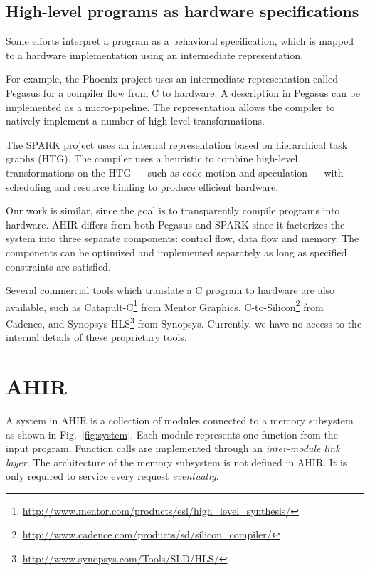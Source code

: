 \documentclass[conference]{IEEEtran}
\begin{document}
\subsection{High-level programs as hardware specifications}

Some efforts interpret a program as a behavioral
specification, which is mapped to a hardware implementation using an
intermediate representation.

For example, the Phoenix project uses an intermediate representation
called Pegasus\cite{pegasus-ir} for a compiler flow from C to
hardware\cite{pegasus-cash}. A description in Pegasus can be
implemented as a micro-pipeline. The representation allows the compiler
to natively implement a number of high-level transformations.

The SPARK\cite{spark-vlsi-paper} project uses an internal
representation based on hierarchical task graphs (HTG). The compiler
uses a heuristic to combine high-level transformations on the HTG ---
such as code motion and speculation\cite{spark-code-motion} --- with
scheduling and resource binding to produce efficient hardware.

Our work is similar, since the goal is to transparently compile
programs into hardware. AHIR differs from both Pegasus and SPARK since
it factorizes the system into three separate components: control flow,
data flow and memory.  The components can be optimized and
implemented separately as long as specified constraints are satisfied.

Several commercial tools which translate a C program to hardware are
also available, such as 
Catapult-C\footnote{\url{http://www.mentor.com/products/esl/high_level_synthesis/}}
from Mentor Graphics,
C-to-Silicon\footnote{\url{http://www.cadence.com/products/sd/silicon_compiler/}}
from Cadence, and Synopsys
HLS\footnote{\url{http://www.synopsys.com/Tools/SLD/HLS/}} from
Synopsys. Currently, we have no access to the internal details of
these proprietary tools.


\section{AHIR}

A system in AHIR is a collection of modules connected to a memory
subsystem as shown in Fig.~\ref{fig:system}. Each module represents
one function from the input program. Function calls are implemented
through an \emph{inter-module link layer}. The architecture of the
memory subsystem is not defined in AHIR. It is only required to
service every request \emph{eventually}.
\end{document}
